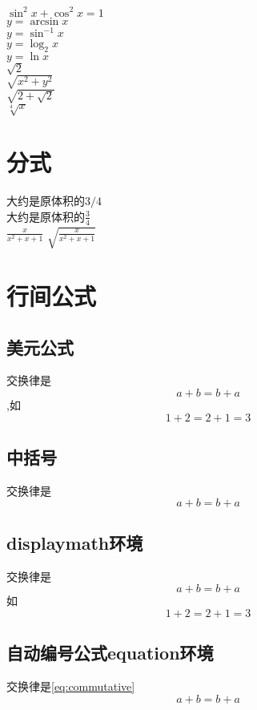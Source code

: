 \documentclass{ctexart}
\begin{document}
    $\sin^2 x + \cos^2 x = 1 $ \\
    $y= \arcsin x$ \\
    $y = \sin^{-1} x$ \\
    $y = \log_2 x $ \\
    $y= \ln x $ \\
    $\sqrt{2}$ \\
    $\sqrt{x^2 +y^2}$ \\ 
    $\sqrt{2 + \sqrt{2}}$ \\ 
    $\sqrt[4]{x}$ \\

    \section{分式}
    大约是原体积的$3/4$ \\
    大约是原体积的$\frac{3}{4}$ \\

    $\frac{x}{x^2 + x + 1 }$
    $\sqrt{\frac{x}{x^2 + x + 1}}$
    \section{行间公式}
    \subsection{美元公式}
    交换律是$$ a +b = b+a $$,如 $$1+2 = 2+1 =3 $$
    \subsection{中括号}
    交换律是\[a+b=b+a\]
    \subsection{displaymath环境}
    交换律是\begin{displaymath}
        a+b=b+a
    \end{displaymath}
    如
    \begin{displaymath}
        1+2=2+1=3
    \end{displaymath}
    \subsection{自动编号公式equation环境}
    交换律是\ref{eq:commutative}
    \begin{equation}
        a+b=b+a \label{eq:commutative}
    \end{equation}
\end{document}

